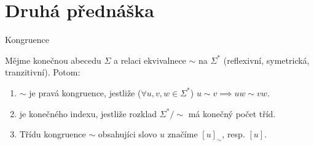 \documentclass[../main.tex]{subfiles}
\begin{document}
\section{Druhá přednáška}

\begin{definition}
    Kongruence

    Mějme konečnou abecedu $\Sigma$ a relaci ekvivalnece $\sim$ na $\Sigma^*$ 
    (reflexivní, symetrická, tranzitivní). Potom:
    \begin{enumerate}
        \item $\sim$ je pravá kongruence, jestliže ($\forall u,v,w \in \Sigma^*$)
        $u\sim v \implies uw \sim vw$.
        \item je konečného indexu, jestliže rozklad $\Sigma^*/\sim$ má konečný počet
        tříd.
        \item Třídu kongruence $\sim$ obsahujíci slovo $u$ značíme $[u]_\sim$, resp. $[u]$.
    \end{enumerate}
\end{definition}
\end{document}
